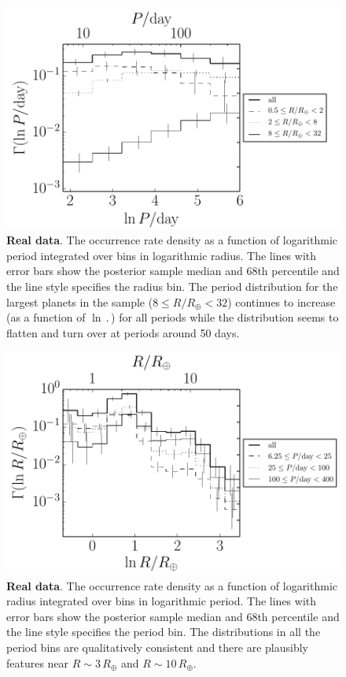 \begin{figure}[p]
\begin{center}
\includegraphics{figures/exopop/results/period.pdf}
\end{center}
\caption{%
{\bf Real data}.
The occurrence rate density as a function of logarithmic period integrated
over bins in logarithmic radius.
The lines with error bars show the posterior sample median and 68th
percentile and the line style specifies the radius bin.
The period distribution for the largest planets in the sample
($8 \le R/R_\oplus < 32$) continues to increase (as a function of
$\ln\period$) for all periods while the distribution seems to flatten and
turn over at periods around 50 days.
}
\end{figure}

\begin{figure}[p]
\begin{center}
\includegraphics{figures/exopop/results/radius.pdf}
\end{center}
\caption{%
{\bf Real data}.
The occurrence rate density as a function of logarithmic radius integrated
over bins in logarithmic period.
The lines with error bars show the posterior sample median and 68th
percentile and the line style specifies the period bin.
The distributions in all the period bins are qualitatively consistent and
there are plausibly features near $R\sim3\,R_\oplus$ and $R\sim10\,R_\oplus$.
}
\end{figure}

